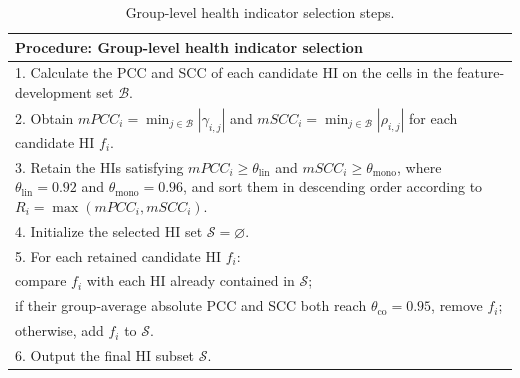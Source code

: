 \begin{table}[!htb]
\TableStyle
\caption{Group-level health indicator selection steps.}
\label{tab:2-hi-screening-steps}
\begin{tabularx}{\linewidth}{@{}X@{}}
\toprule
\textbf{Procedure: Group-level health indicator selection} \\
\midrule
1. Calculate the PCC and SCC of each candidate HI on the cells in the feature-development set $\mathcal{B}$. \\
2. Obtain $mPCC_i=\min_{j\in\mathcal{B}}|\gamma_{i,j}|$ and $mSCC_i=\min_{j\in\mathcal{B}}|\rho_{i,j}|$ for each candidate HI $f_i$. \\
3. Retain the HIs satisfying $mPCC_i\geq\theta_{\mathrm{lin}}$ and $mSCC_i\geq\theta_{\mathrm{mono}}$, where $\theta_{\mathrm{lin}}=0.92$ and $\theta_{\mathrm{mono}}=0.96$, and sort them in descending order according to $R_i=\max(mPCC_i,mSCC_i)$. \\
4. Initialize the selected HI set $\mathcal{S}=\varnothing$. \\
5. For each retained candidate HI $f_i$: \\
\hspace*{1em}compare $f_i$ with each HI already contained in $\mathcal{S}$; \\
\hspace*{1em}if their group-average absolute PCC and SCC both reach $\theta_{\mathrm{co}}=0.95$, remove $f_i$; \\
\hspace*{1em}otherwise, add $f_i$ to $\mathcal{S}$. \\
6. Output the final HI subset $\mathcal{S}$. \\
\bottomrule
\end{tabularx}
\end{table}
